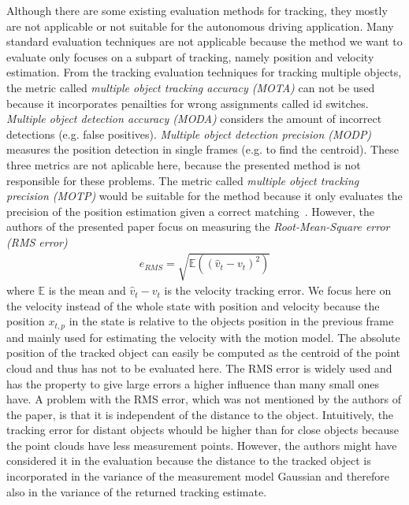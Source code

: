 \documentclass[twoside,a4paper,article]{combine}
\begin{document}
Although there are some existing evaluation methods for tracking, they
mostly are not applicable or not suitable for the autonomous driving
application. Many standard evaluation techniques are not applicable
because the method we want to evaluate only focuses on a subpart of
tracking, namely position and velocity estimation. From the tracking
evaluation techniques for tracking multiple objects, the metric called
\textit{multiple object tracking accuracy (MOTA)} can not be used
because it incorporates penailties for wrong assignments called id
switches. \textit{Multiple object detection accuracy (MODA)} considers
the amount of incorrect detections (e.g. false
positives). \textit{Multiple object detection precision (MODP)}
measures the position detection in single frames (e.g. to find the
centroid). These three metrics are not aplicable here, because the
presented method is not responsible for these problems. The metric
called \textit{multiple object tracking precision (MOTP)} would be
suitable for the method because it only evaluates the precision of the
position estimation given a correct matching~\cite{mot,mot2}. However,
the authors of the presented paper focus on measuring the
\textit{Root-Mean-Square error (RMS error)}
\begin{align}
  e_{RMS}=\sqrt{\mathbb{E}((\hat{v}_t-v_t)^2)}
\end{align}
where $\mathbb{E}$ is the mean and $\hat{v}_t-v_t$ is the velocity
tracking error. We focus here on the velocity instead of the whole
state with position and velocity because the position $x_{t,p}$ in the
state is relative to the objects position in the previous frame and
mainly used for estimating the velocity with the motion model. The
absolute position of the tracked object can easily be computed as the
centroid of the point cloud and thus has not to be evaluated here. The
RMS error is widely used and has the property to give large errors a
higher influence than many small ones have. A problem with the RMS
error, which was not mentioned by the authors of the paper, is that it
is independent of the distance to the object. Intuitively, the
tracking error for distant objects whould be higher than for close
objects because the point clouds have less measurement
points. However, the authors might have considered it in the
evaluation because the distance to the tracked object is incorporated
in the variance of the measurement model Gaussian and therefore also
in the variance of the returned tracking estimate.
\end{document}
